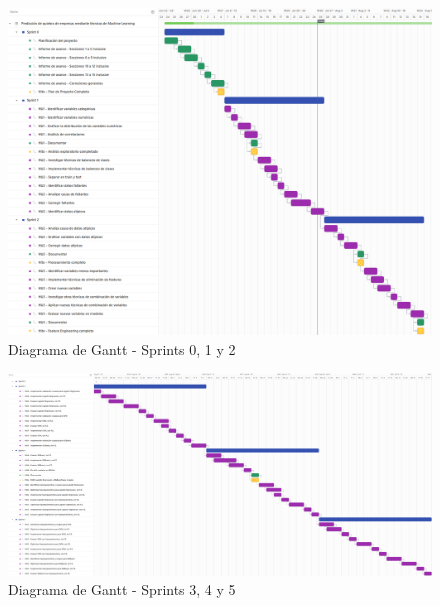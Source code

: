 \documentclass[
11pt, %
]{charter}
\begin{document}

\pagebreak

\begin{landscape}
\begin{figure}[htpb]
\centering 
\includegraphics[width=1.2\textwidth]{./Figuras/Gantt-1.png}
\caption{Diagrama de Gantt - Sprints 0, 1 y 2}
\label{fig:gantt1}
\end{figure}
\end{landscape}

\begin{landscape}
\begin{figure}[htpb]
\centering 
\includegraphics[width=1.5\textwidth]{./Figuras/Gantt-2.png}
\caption{Diagrama de Gantt - Sprints 3, 4 y 5}
\label{fig:gantt2}
\end{figure}
\end{landscape}
\end{document}
